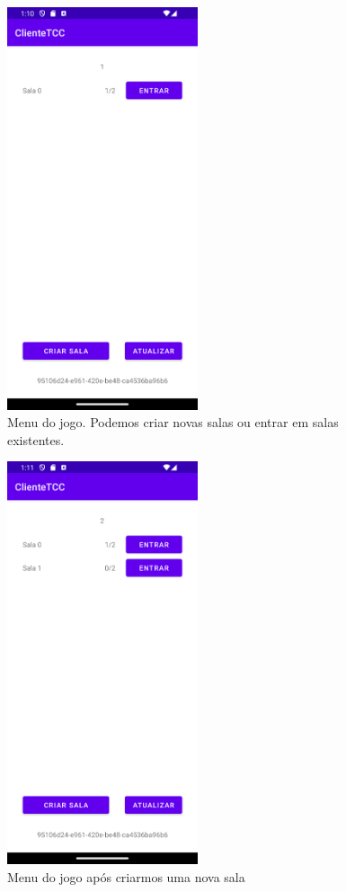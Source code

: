 \documentclass[12pt]{article}
\begin{document}
\begin{figure}[ht]
\centering
\includegraphics[width=0.5\textwidth]{tela_menu.png}
\caption{Menu do jogo. Podemos criar novas salas ou entrar em salas existentes.}
\label{fig:jogofig2}
\end{figure}
\break
\begin{figure}[ht]
\centering
\includegraphics[width=0.5\textwidth]{tela_menu2.png}
\caption{Menu do jogo após criarmos uma nova sala}
\label{fig:jogofig3}
\end{figure}
\end{document}
